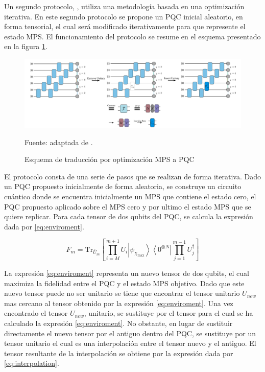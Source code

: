 \newpage

Un segundo protocolo, \citep{shirakawa}, utiliza una metodología basada en una optimización iterativa. En este segundo protocolo se propone un PQC inicial aleatorio, en forma tensorial, el cual será modificado iterativamente para que represente el estado MPS. El funcionamiento del protocolo se resume en el esquema presentado en la figura \ref{fig:mps_to_pqc_o}.


\begin{figure}[!h]
    \centering
    \includegraphics[scale = 0.6]{img/05-mps_to_pqc_o.png}
    \caption{Esquema de traducción por optimización MPS a PQC}
    Fuente: adaptada de \citep{rudolph}.
    \label{fig:mps_to_pqc_o}
\end{figure}

El protocolo consta de una serie de pasos que se realizan de forma iterativa. Dado un PQC propuesto inicialmente de forma aleatoria, se construye un circuito cuántico donde se encuentra inicialmente un MPS que contiene el estado cero, el PQC propuesto aplicado sobre el MPS cero y por ultimo el estado MPS que se quiere replicar. Para cada tensor de dos qubits del PQC, se calcula la expresión dada por \ref{eq:enviroment}.


\begin{equation}
    \hat{F}_m = \mathrm{Tr}_{\bar{U}_m} \left[ \prod_{i=M}^{m+1} U_i \left| \psi_{\chi_{\max}} \right\rangle \left\langle 0^{\otimes N} \right| \prod_{j=1}^{m-1} U_j^\dagger \right]
    \label{eq:enviroment}
\end{equation}

La expresión \ref{eq:enviroment} representa un nuevo tensor de dos qubits, el cual maximiza la fidelidad entre el PQC y el estado MPS objetivo. Dado que este nuevo tensor puede no ser unitario se tiene que encontrar el tensor unitario $U_{new}$ mas cercano al tensor obtenido por la expresión \ref{eq:enviroment}. Una vez encontrado el tensor $U_{new}$, unitario, se sustituye por el tensor para el cual se ha calculado la expresión \ref{eq:enviroment}. No obstante, en lugar de sustituir directamente el nuevo tensor por el antiguo dentro del PQC, se sustituye por un tensor unitario el cual es una interpolación entre el tensor nuevo y el antiguo. El tensor resultante de la interpolación se obtiene por la expresión dada por \ref{eq:interpolation}.

